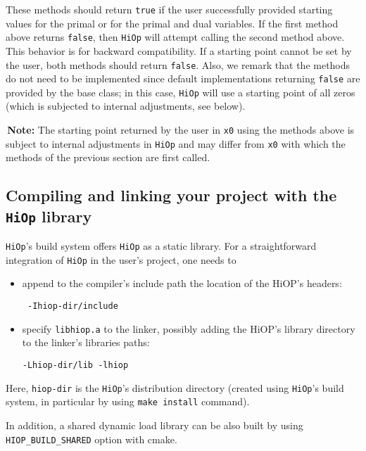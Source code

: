 \documentclass[11pt]{article}
\newcommand{\warningSymbol}{\raisebox{0.9\depth}{\danger}}
\newcommand{\warningcp}[1]{%
        \smallskip \noindent \textcolor{warningColorText}{\warningSymbol{}}\,\textbf{#1} %
    }
\newcommand{\Hi}{\texttt{HiOp}\xspace}
\begin{document}
These methods should return \texttt{true} if the user successfully provided starting values for the primal or for the primal and dual variables. If the first method above returns \texttt{false},  then \Hi will attempt calling the second method above. This behavior is for backward compatibility. If a starting point cannot be set by the user, both methods should return \texttt{false}. Also, we remark that the  methods do not need to be implemented since  default implementations returning \texttt{false} are provided by the base class; in this case, \Hi will use a starting point of all zeros (which is subjected to internal adjustments, see below).


\warningcp{Note:} The starting point returned by the user in \texttt{x0} using the methods above is subject to internal adjustments in \Hi and may differ from \texttt{x0} with which the methods of the previous section are first called.



\subsection{Compiling and linking your project with the \Hi library}
\Hi's build system offers \Hi as a static library. For a straightforward integration of \Hi in the user's project, one needs  to
\begin{itemize}
\item append to the compiler's include path the location of the HiOP's headers: \begin{verbatim} -Ihiop-dir/include \end{verbatim}
\item specify \texttt{libhiop.a} to the linker, possibly adding the HiOP's library directory to the linker's libraries paths: 
\begin{verbatim}-Lhiop-dir/lib -lhiop\end{verbatim} \end{itemize}
Here, \texttt{hiop-dir} is the \Hi's distribution directory  (created using \Hi's build system, in particular   by using \texttt{make install} command).

In addition, a shared dynamic load library can be also built by using \texttt{HIOP\_BUILD\_SHARED} option with cmake. 
\end{document}
